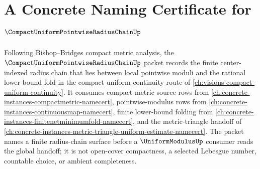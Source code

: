 \chapter{A Concrete Naming Certificate for $\CompactUniformPointwiseRadiusChainUp$}
\label{ch:concrete-instances-compact-uniform-pointwise-radius-chain-namecert}

Following Bishop--Bridges compact metric analysis, the $\CompactUniformPointwiseRadiusChainUp$ packet records the finite center-indexed radius chain that lies between local pointwise moduli and the rational lower-bound fold in the compact-uniform-continuity route of \autoref{ch:visions-compact-uniform-continuity}. It consumes compact metric source rows from \autoref{ch:concrete-instances-compactmetric-namecert}, pointwise-modulus rows from \autoref{ch:concrete-instances-continuousmap-namecert}, finite lower-bound folding from \autoref{ch:concrete-instances-finitenetminimumfold-namecert}, and the metric-triangle handoff of \autoref{ch:concrete-instances-metric-triangle-uniform-estimate-namecert}. The packet names a finite radius-chain surface before a $\UniformModulusUp$ consumer reads the global handoff; it is not open-cover compactness, a selected Lebesgue number, countable choice, or ambient completeness.

